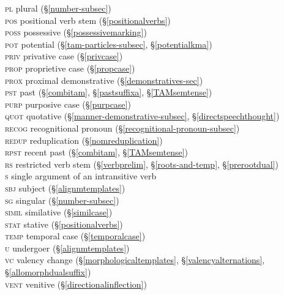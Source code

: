 \begin{tabbing}
	\textsc{pl} \> {plural (\S\ref{number-subsec})}\\
	\textsc{pos} \> {positional verb stem (\S\ref{positionalverbs})}\\
	\textsc{poss} \> {possessive (\S\ref{possessivemarking})}\\
	\textsc{pot} \> {potential (\S\ref{tam-particles-subsec}, \S\ref{potentialkma})}\\
	\textsc{priv} \> {privative case (\S\ref{privcase})}\\
	\textsc{prop} \> {proprietive case (\S\ref{propcase})}\\
	\textsc{prox} \> {proximal demonstrative (\S\ref{demonstratives-sec})}\\
	\textsc{pst} \> {past (\S\ref{combitam}, \S\ref{pastsuffixa}, \S\ref{TAMsemtense})}\\
	\textsc{purp} \> {purposive case (\S\ref{purpcase})}\\
	\textsc{quot} \> {quotative (\S\ref{manner-demonstrative-subsec}, \S\ref{directspeechthought})}\\
	\textsc{recog} \> {recognitional pronoun (\S\ref{recognitional-pronoun-subsec})}\\
	\textsc{redup} \> {reduplication (\S\ref{nomreduplication})}\\
	\textsc{rpst} \> {recent past (\S\ref{combitam}, \S\ref{TAMsemtense})}\\
	\textsc{rs} \> {restricted verb stem (\S\ref{verbprelim}, \S\ref{roots-and-temp}, \S\ref{prerootdual})}\\
	\textsc{s} \> {single argument of an intransitive verb}\\
	\textsc{sbj} \> {subject (\S\ref{alignmtemplates})}\\
	\textsc{sg} \> {singular (\S\ref{number-subsec})}\\
	\textsc{simil} \> {similative (\S\ref{similcase})}\\
	\textsc{stat} \> {stative (\S\ref{positionalverbs})}\\
	\textsc{temp} \> {temporal case (\S\ref{temporalcase})}\\
	\textsc{u} \> {undergoer (\S\ref{alignmtemplates})}\\
	\textsc{vc} \> {valency change (\S\ref{morphologicaltemplates}, \S\ref{valencyalternations}, \S\ref{allomorphdualsuffix})}\\
	\textsc{vent} \> {venitive (\S\ref{directionalinflection})}\\

\end{tabbing}